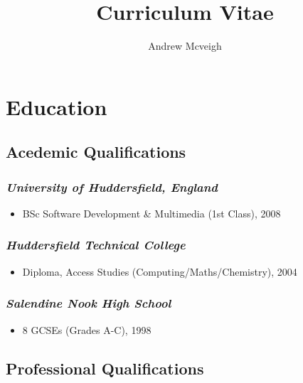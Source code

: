 \documentclass{article}
\title{Curriculum Vitae}
\author{Andrew Mcveigh}
\date{}
\begin{document}
\maketitle







\title{\vspace{-10mm}}



\section*{Education}
\label{sec-1}

\subsection*{Acedemic Qualifications}
\label{sec-1.1}

\subsubsection*{\emph{University of Huddersfield, England}}
\label{sec-1.1.1}

\begin{itemize}
\item BSc Software Development \& Multimedia (1st Class), 2008
\end{itemize}
\subsubsection*{\emph{Huddersfield Technical College}}
\label{sec-1.1.2}

\begin{itemize}
\item Diploma, Access Studies (Computing/Maths/Chemistry), 2004
\end{itemize}
\subsubsection*{\emph{Salendine Nook High School}}
\label{sec-1.1.3}

\begin{itemize}
\item 8 GCSEs (Grades A-C), 1998
\end{itemize}
\subsection*{Professional Qualifications}
\label{sec-1.2}
\end{document}
